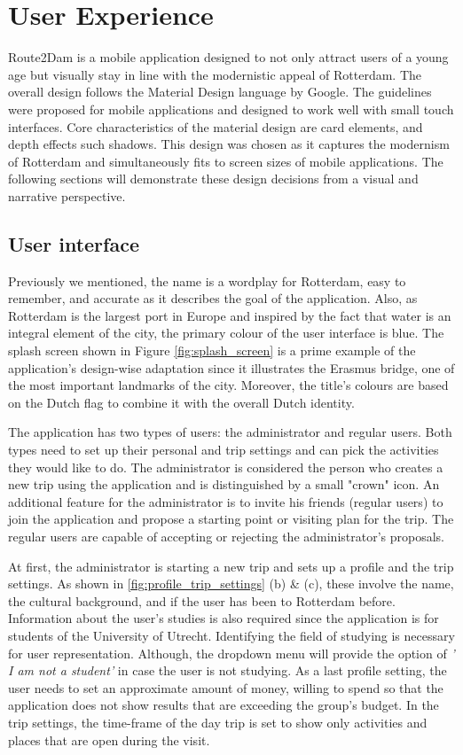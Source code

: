 \documentclass[11pt,a4paper,oneside]{article}
\begin{document}
\section{User Experience}
\label{sec:UX}
Route2Dam is a mobile application designed to not only attract users of a young age but visually stay in line with the modernistic appeal of Rotterdam. The overall design follows the Material Design language by Google.\cite{googleinc._MaterialDesign_2014} The guidelines were proposed for mobile applications and designed to work well with small touch interfaces. Core characteristics of the material design are card elements, and depth effects such shadows. This design was chosen as it captures the modernism of Rotterdam and simultaneously fits to screen sizes of mobile applications. The following sections will demonstrate these design decisions from a visual and narrative perspective.

\subsection{User interface}
Previously we mentioned, the name is a wordplay for Rotterdam, easy to remember, and accurate as it describes the goal of the application. Also, as Rotterdam is the largest port in Europe and inspired by the fact that water is an integral element of the city, the primary colour of the user interface is blue. The splash screen shown in Figure \autoref{fig:splash_screen} is a prime example of the application's design-wise adaptation since it illustrates the Erasmus bridge, one of the most important landmarks of the city. Moreover, the title's colours are based on the Dutch flag to combine it with the overall Dutch identity.      


The application has two types of users: the administrator and regular users. Both types need to set up their personal and trip settings and can pick the activities they would like to do. The administrator is considered the person who creates a new trip using the application and is distinguished by a small "crown" icon. An additional feature for the administrator is to invite his friends (regular users) to join the application and propose a starting point or visiting plan for the trip. The regular users are capable of accepting or rejecting the administrator's proposals.

At first, the administrator is starting a new trip and sets up a profile and the trip settings. As shown in \autoref{fig:profile_trip_settings} (b) \& (c), these involve the name, the cultural background, and if the user has been to Rotterdam before. Information about the user's studies is also required since the application is for students of the University of Utrecht. Identifying the field of studying is necessary for user representation. Although, the dropdown menu will provide the option of \emph{' I am not a student'} in case the user is not studying. As a last profile setting, the user needs to set an approximate amount of money, willing to spend so that the application does not show results that are exceeding the group's budget. In the trip settings, the time-frame of the day trip is set to show only activities and places that are open during the visit.
\end{document}
